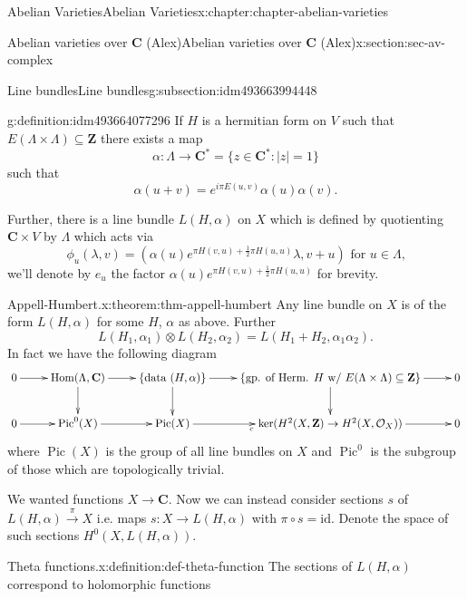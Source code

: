 \documentclass[oneside,10pt,]{book}
\numberwithin{equation}{section}
\newcommand{\sheaf}[1]{\operatorname{\mathcal{#1}}}
\newcommand{\ZZ}{\mathbf{Z}}
\newcommand{\CC}{\mathbf{C}}
\newcommand{\id}{\mathrm{id}}
\DeclareMathOperator{\Hom}{Hom}
\DeclareMathOperator{\Pic}{Pic}
\begin{document}
\begin{chapterptx}{Abelian Varieties}{}{Abelian Varieties}{}{}{x:chapter:chapter-abelian-varieties}
\begin{sectionptx}{Abelian varieties over \(\CC\) (Alex)}{}{Abelian varieties over \(\CC\) (Alex)}{}{}{x:section:sec-av-complex}
\begin{subsectionptx}{Line bundles}{}{Line bundles}{}{}{g:subsection:idm493663994448}
\begin{definition}{}{g:definition:idm493664077296}%
If \(H\) is a hermitian form on \(V\) such that \(E(\Lambda\times\Lambda) \subseteq \ZZ\) there exists a map%
\begin{equation*}
\alpha \colon \Lambda \to \CC^*  = \{z\in \CC^* : |z| = 1\}
\end{equation*}
such that%
\begin{equation*}
\alpha(u + v) = e^{i\pi E(u,v)} \alpha(u) \alpha(v)\text{.}
\end{equation*}
%
\par
Further, there is a line bundle \(L(H, \alpha)\) on \(X\) which is defined by quotienting \(\CC\times V\) by \(\Lambda\) which acts via%
\begin{equation*}
\phi_u(\lambda, v) = (\alpha(u)e^{\pi H(v,u) + \frac12 \pi H(u,u)}\lambda, v+u)\text{ for } u\in \Lambda\text{,}
\end{equation*}
we'll denote by \(e_u\) the factor \(\alpha(u)e^{\pi H(v,u) + \frac12 \pi H(u,u)}\) for brevity.%
\end{definition}
\begin{theorem}{Appell-Humbert.}{}{x:theorem:thm-appell-humbert}%
Any line bundle on \(X\) is of the form \(L(H,\alpha)\) for some \(H\), \(\alpha\) as above. Further%
\begin{equation*}
L(H_1, \alpha_1) \otimes L(H_2, \alpha_2)  = L(H_1+ H_2, \alpha_1\alpha_2)\text{.}
\end{equation*}
In fact we have the following diagram%
\begin{equation*}
\xymatrix{
0 \ar[r] &
\Hom(\Lambda, \CC) \ar[r]\ar[d] &
\{\text{data } (H,\alpha)\} \ar[r]\ar[d] &
\{\text{gp. of Herm. } H \text{ w/ }E(\Lambda\times \Lambda) \subseteq \ZZ\} \ar[r]\ar[d] &
0 \\
0 \ar[r] &
\Pic^0(X) \ar[r] &
\Pic(X) \ar[r]_c &
\ker(H^2(X,\ZZ) \to H^2(X,\sheaf O_X)) \ar[r]&
0
}
\end{equation*}
where \(\Pic(X)\) is the group of all line bundles on \(X\) and \(\Pic^0\) is the subgroup of those which are topologically trivial.%
\end{theorem}
We wanted functions \(X\to \CC\). Now we can instead consider sections \(s\) of \(L(H,\alpha) \xrightarrow{\pi} X\) i.e. maps \(s\colon X\to L(H,\alpha)\) with \(\pi\circ s = \id\). Denote the space of such sections \(H^0(X,L(H,\alpha))\).%
\begin{definition}{Theta functions.}{x:definition:def-theta-function}%
The sections of \(L(H, \alpha)\)  correspond to holomorphic functions%

\end{definition}
\end{subsectionptx}
\end{sectionptx}
\end{chapterptx}
\end{document}
